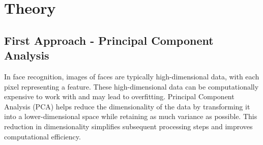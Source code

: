 \documentclass{article}
\begin{document}
\section{Theory}

\subsection{First Approach - Principal Component Analysis}

In face recognition, images of faces are typically high-dimensional data, with each pixel representing a feature. These high-dimensional data can be computationally expensive to work with and may lead to overfitting. Principal Component Analysis (PCA) helps reduce the dimensionality of the data by transforming it into a lower-dimensional space while retaining as much variance as possible. This reduction in dimensionality simplifies subsequent processing steps and improves computational efficiency.
\end{document}
